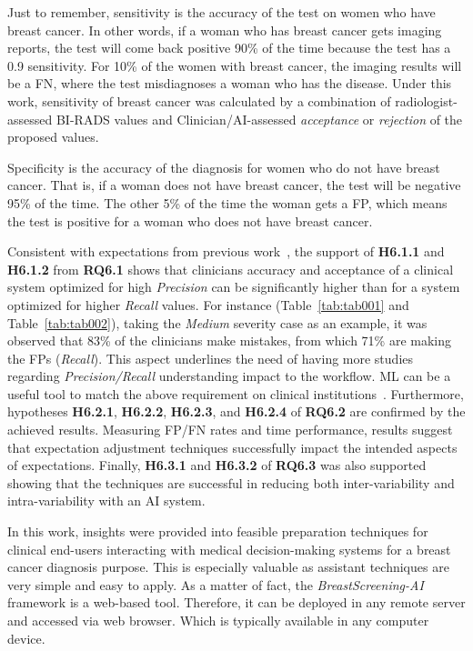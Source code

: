 Just to remember, sensitivity is the accuracy of the test on women who have breast cancer.
In other words, if a woman who has breast cancer gets imaging reports, the test will come back positive 90\% of the time because the test has a 0.9 sensitivity.
For 10\% of the women with breast cancer, the imaging results will be a \ac{FN}, where the test misdiagnoses a woman who has the disease.
Under this work, sensitivity of breast cancer was calculated by a combination of radiologist-assessed \ac{BI-RADS} values and Clinician/\ac{AI}-assessed {\it acceptance} or {\it rejection} of the proposed values.

Specificity is the accuracy of the diagnosis for women who do not have breast cancer.
That is, if a woman does not have breast cancer, the test will be negative 95\% of the time.
The other 5\% of the time the woman gets a \ac{FP}, which means the test is positive for a woman who does not have breast cancer.

Consistent with expectations from previous work~\cite{chaurasia2017novel, topol2019high}, the support of {\bf H6.1.1} and {\bf H6.1.2} from {\bf RQ6.1} shows that clinicians accuracy and acceptance of a clinical system optimized for high {\it Precision} can be significantly higher than for a system optimized for higher {\it Recall} values.
For instance (Table~\ref{tab:tab001} and Table~\ref{tab:tab002}), taking the {\it Medium} severity case as an example, it was observed that 83\% of the clinicians make mistakes, from which 71\% are making the \acp{FP} ({\it Recall}).
This aspect underlines the need of having more studies regarding {\it Precision/Recall} understanding impact to the workflow.
\ac{ML} can be a useful tool to match the above requirement  on clinical institutions~\cite{Dove:2017:UDI:3025453.3025739, Kocielnik:2019:YAI:3290605.3300641}.
Furthermore, hypotheses {\bf H6.2.1}, {\bf H6.2.2}, {\bf H6.2.3}, and {\bf H6.2.4} of {\bf RQ6.2} are confirmed by the achieved results.
Measuring \ac{FP}/\ac{FN} rates and time performance, results suggest that expectation adjustment techniques successfully impact the intended aspects of expectations.
Finally, {\bf H6.3.1} and {\bf H6.3.2} of {\bf RQ6.3} was also supported showing that the techniques are successful in reducing both inter-variability and intra-variability with an \ac{AI} system.

In this work, insights were provided into feasible preparation techniques for clinical end-users interacting with medical decision-making systems for a breast cancer diagnosis purpose.
This is especially valuable as assistant techniques are very simple and easy to apply.
As a matter of fact, the {\it BreastScreening-AI} framework is a web-based tool.
Therefore, it can be deployed in any remote server and accessed via web browser.
Which is typically available in any computer device.


